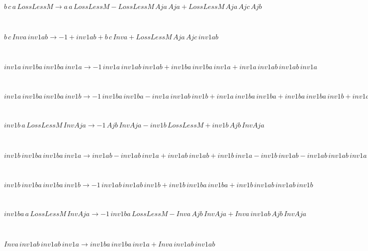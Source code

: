 \begin{minipage}{6in}
$
b\,
 c\,
 a\,
 LossLessM\rightarrow a\,
 a\,
 LossLessM - LossLessM\,
 Aja\,
 Aja + LossLessM\,
 Aja\,
 Ajc\,
 Ajb
$
\end{minipage}\medskip \\
\begin{minipage}{6in}
$
b\,
 c\,
 Inva\,
 inv1ab\rightarrow -1 + inv1ab + b\,
 c\,
 Inva + LossLessM\,
 Aja\,
 Ajc\,
 inv1ab
$
\end{minipage}\medskip \\
\begin{minipage}{6in}
$
inv1a\,
 inv1ba\,
 inv1ba\,
 inv1a\rightarrow -1\,
 inv1a\,
 inv1ab\,
 inv1ab + inv1ba\,
 inv1ba\,
 inv1a + inv1a\,
 inv1ab\,
 inv1ab\,
 inv1a
$
\end{minipage}\medskip \\
\begin{minipage}{6in}
$
inv1a\,
 inv1ba\,
 inv1ba\,
 inv1b\rightarrow -1\,
 inv1ba\,
 inv1ba - inv1a\,
 inv1ab\,
 inv1b + inv1a\,
 inv1ba\,
 inv1ba + inv1ba\,
 inv1ba\,
 inv1b + inv1a\,
 inv1ab\,
 inv1ab\,
 inv1b
$
\end{minipage}\medskip \\
\begin{minipage}{6in}
$
inv1b\,
 a\,
 LossLessM\,
 InvAja\rightarrow -1\,
 Ajb\,
 InvAja - inv1b\,
 LossLessM + inv1b\,
 Ajb\,
 InvAja
$
\end{minipage}\medskip \\
\begin{minipage}{6in}
$
inv1b\,
 inv1ba\,
 inv1ba\,
 inv1a\rightarrow inv1ab - inv1ab\,
 inv1a + inv1ab\,
 inv1ab + inv1b\,
 inv1a - inv1b\,
 inv1ab - inv1ab\,
 inv1ab\,
 inv1a + inv1b\,
 inv1ab\,
 inv1a - inv1b\,
 inv1ab\,
 inv1ab + inv1b\,
 inv1ab\,
 inv1ab\,
 inv1a
$
\end{minipage}\medskip \\
\begin{minipage}{6in}
$
inv1b\,
 inv1ba\,
 inv1ba\,
 inv1b\rightarrow -1\,
 inv1ab\,
 inv1ab\,
 inv1b + inv1b\,
 inv1ba\,
 inv1ba + inv1b\,
 inv1ab\,
 inv1ab\,
 inv1b
$
\end{minipage}\medskip \\
\begin{minipage}{6in}
$
inv1ba\,
 a\,
 LossLessM\,
 InvAja\rightarrow -1\,
 inv1ba\,
 LossLessM - Inva\,
 Ajb\,
 InvAja + Inva\,
 inv1ab\,
 Ajb\,
 InvAja
$
\end{minipage}\medskip \\
\begin{minipage}{6in}
$
Inva\,
 inv1ab\,
 inv1ab\,
 inv1a\rightarrow inv1ba\,
 inv1ba\,
 inv1a + Inva\,
 inv1ab\,
 inv1ab
$
\end{minipage}\medskip \\

